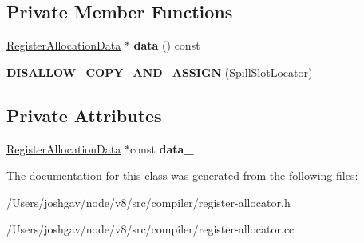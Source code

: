 \subsection*{Private Member Functions}
\begin{DoxyCompactItemize}
\item 
\hyperlink{classv8_1_1internal_1_1compiler_1_1_register_allocation_data}{Register\+Allocation\+Data} $\ast$ {\bfseries data} () const \hypertarget{classv8_1_1internal_1_1compiler_1_1_spill_slot_locator_a0b4e8ea4cd8486a109b3ab8215d0582d}{}\label{classv8_1_1internal_1_1compiler_1_1_spill_slot_locator_a0b4e8ea4cd8486a109b3ab8215d0582d}

\item 
{\bfseries D\+I\+S\+A\+L\+L\+O\+W\+\_\+\+C\+O\+P\+Y\+\_\+\+A\+N\+D\+\_\+\+A\+S\+S\+I\+GN} (\hyperlink{classv8_1_1internal_1_1compiler_1_1_spill_slot_locator}{Spill\+Slot\+Locator})\hypertarget{classv8_1_1internal_1_1compiler_1_1_spill_slot_locator_a043038bde9ef4b034abf7dae0a3d4c8a}{}\label{classv8_1_1internal_1_1compiler_1_1_spill_slot_locator_a043038bde9ef4b034abf7dae0a3d4c8a}

\end{DoxyCompactItemize}
\subsection*{Private Attributes}
\begin{DoxyCompactItemize}
\item 
\hyperlink{classv8_1_1internal_1_1compiler_1_1_register_allocation_data}{Register\+Allocation\+Data} $\ast$const {\bfseries data\+\_\+}\hypertarget{classv8_1_1internal_1_1compiler_1_1_spill_slot_locator_a37961499f0bdb28d679211c121b40dae}{}\label{classv8_1_1internal_1_1compiler_1_1_spill_slot_locator_a37961499f0bdb28d679211c121b40dae}

\end{DoxyCompactItemize}


The documentation for this class was generated from the following files\+:\begin{DoxyCompactItemize}
\item 
/\+Users/joshgav/node/v8/src/compiler/register-\/allocator.\+h\item 
/\+Users/joshgav/node/v8/src/compiler/register-\/allocator.\+cc\end{DoxyCompactItemize}
